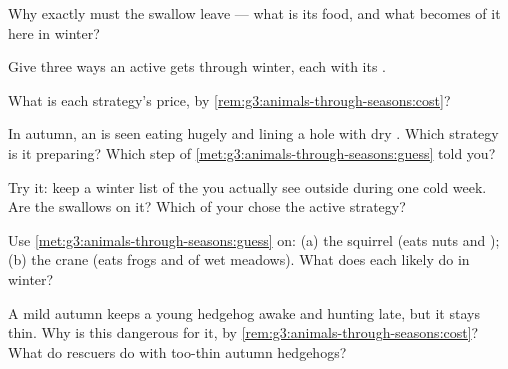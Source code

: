 \begin{exercise}[$\star$]\label{exo:g3:animals-through-seasons:4}
Why exactly must the swallow leave --- what is its food, and
what becomes of it here in winter?
\end{exercise}

\begin{exercise}[$\star$]\label{exo:g3:animals-through-seasons:5}
Give three ways an active  gets through winter, each with
its .
\end{exercise}

\begin{exercise}[$\star$]\label{exo:g3:animals-through-seasons:6}
What is each strategy's price, by
\cref{rem:g3:animals-through-seasons:cost}?
\end{exercise}

\begin{exercise}[$\star$]\label{exo:g3:animals-through-seasons:7}
In autumn, an  is seen eating hugely and lining a hole
with dry . Which strategy is it preparing? Which step of
\cref{met:g3:animals-through-seasons:guess} told you?
\end{exercise}

\begin{exercise}[$\star$]\label{exo:g3:animals-through-seasons:8}
Try it: keep a winter list of the  you actually see
outside during one cold week. Are the swallows on it? Which of
your  chose the active strategy?
\end{exercise}

\begin{exercise}[$\star\star$]\label{exo:g3:animals-through-seasons:9}
Use \cref{met:g3:animals-through-seasons:guess} on: (a) the
squirrel (eats nuts and ); (b) the crane (eats frogs and
 of wet meadows). What does each likely do in winter?
\end{exercise}

\begin{exercise}[$\star\star$]\label{exo:g3:animals-through-seasons:10}
A mild autumn keeps a young hedgehog awake and hunting late,
but it stays thin. Why is this dangerous for it, by
\cref{rem:g3:animals-through-seasons:cost}? What do 
rescuers do with too-thin autumn hedgehogs?
\end{exercise}
